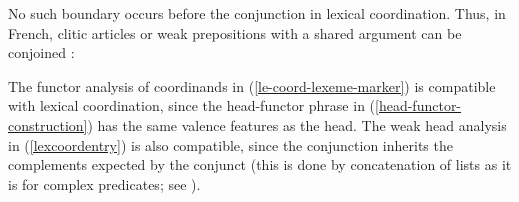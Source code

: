 {\eal
\label{fr1}
\zl




No such boundary occurs before the conjunction in lexical coordination. Thus, in French,  clitic
articles or weak prepositions with a shared argument can be conjoined \citep[]{Abeille:06}:


\eal
{}
\zl

\noindent
The functor analysis of coordinands in (\ref{le-coord-lexeme-marker}) is compatible with lexical coordination, since the head-functor phrase in (\ref{head-functor-construction}) has the same valence features as the head. The weak head analysis in (\ref{lexcoordentry}) is also compatible, since the conjunction inherits the complements expected by the conjunct (this is done by concatenation of 
\comps lists as it is for complex predicates; see ).


                                                    
}
